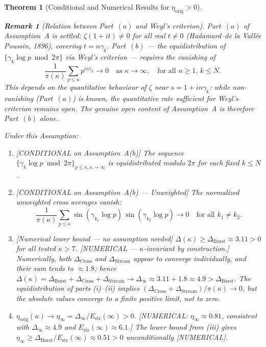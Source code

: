 \documentclass[11pt]{article}
\newtheorem{theorem}{Theorem}[section]
\newtheorem*{remark}{Remark}
\newcommand{\Estr}{E_{\mathrm{str}}}
\newcommand{\etaorig}{\eta_{\mathrm{orig}}}
\newcommand{\Dburstvar}{\Delta_{\mathrm{Burst}}}
\newcommand{\Dcross}{\Delta_{\mathrm{Cross}}}
\newcommand{\Dstream}{\Delta_{\mathrm{Stream}}}
\begin{document}
\begin{theorem}[Conditional and Numerical Results for $\etaorig > 0$]
\begin{remark}[Relation between Part~$(a)$ and Weyl's criterion]
Part~$(a)$ of Assumption~A is settled:
$\zeta(1+it)\neq 0$ for all real $t\neq 0$
(Hadamard--de la Vall\'ee Poussin, 1896), covering $t = n\gamma_k$.
Part~$(b)$ --- the equidistribution of $\{\gamma_k\log p\bmod 2\pi\}$
via Weyl's criterion --- requires the vanishing of
\[
\frac{1}{\pi(\kappa)}\sum_{p\leq\kappa} p^{in\gamma_k} \to 0
\quad\text{as }\kappa\to\infty,\quad\text{for all }n\geq 1,\,k\leq N.
\]
This depends on the \emph{quantitative} behaviour of $\zeta$ near
$s = 1 + in\gamma_k$: while non-vanishing (Part~$(a)$) is known,
the quantitative rate sufficient for Weyl's criterion remains open.
The genuine open content of Assumption~A is therefore Part~$(b)$
alone.
\end{remark}

Under this Assumption:

\begin{enumerate}[label=(\roman*)]
\item \emph{[CONDITIONAL on Assumption~A(b)]}
  The sequence $\{\gamma_k\log p\bmod 2\pi\}_{p\leq\kappa,\kappa\to\infty}$
  is equidistributed modulo $2\pi$ for each fixed $k\leq N$.
\item \emph{[CONDITIONAL on Assumption~A(b) --- Unweighted]}
  The normalized unweighted cross averages vanish:
  \[
  \frac{1}{\pi(\kappa)}\sum_{p\leq\kappa}
  \sin(\gamma_{k_1}\log p)\,\sin(\gamma_{k_2}\log p)\to 0
  \quad\text{for all }k_1\neq k_2.
  \]
\item \emph{[Numerical lower bound --- no assumption needed]}
  $\Delta(\kappa) \geq \Dburstvar \approx 3.11 > 0$ for all tested $\kappa > 7$.
  [NUMERICAL --- $\kappa$-invariant by construction.]
  Numerically, both $\Dcross$ and $\Dstream$ appear to converge individually,
  and their sum tends to $\approx 1.8$; hence
  $\Delta(\kappa) = \Dburstvar + \Dcross + \Dstream
  \to \Delta_\infty \approx 3.11 + 1.8 \approx 4.9 > \Dburstvar$.
  The equidistribution of parts (i)--(ii) implies
  $(\Dcross+\Dstream)/\pi(\kappa)\to 0$, but the absolute values
  converge to a finite positive limit, not to zero.
\item $\etaorig(\kappa)\to\eta_\infty = \Delta_\infty/\Estr(\infty) > 0$.
  [NUMERICAL: $\eta_\infty\approx 0.81$, consistent with
  $\Delta_\infty\approx 4.9$ and $\Estr(\infty)\approx 6.1$.]
  The lower bound from (iii) gives
  $\eta_\infty\geq\Dburstvar/\Estr(\infty)\approx 0.51 > 0$
  unconditionally [NUMERICAL].
\end{enumerate}


\end{theorem}
\end{document}
